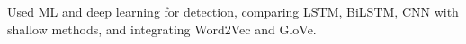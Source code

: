 Used ML and deep learning for detection, comparing LSTM, BiLSTM, CNN with shallow methods, and integrating Word2Vec and GloVe.